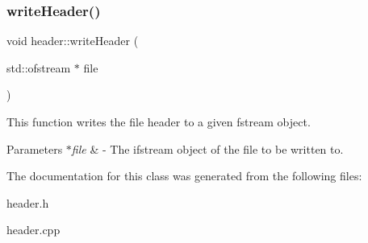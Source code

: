 \subsubsection{\texorpdfstring{write\+Header()}{writeHeader()}}
{\footnotesize\ttfamily void header\+::write\+Header (\begin{DoxyParamCaption}\item[{std\+::ofstream $\ast$}]{file }\end{DoxyParamCaption})}

This function writes the file header to a given fstream object. 
\begin{DoxyParams}{Parameters}
{\em $\ast$file} & -\/ The ifstream object of the file to be written to. \\
\hline
\end{DoxyParams}


The documentation for this class was generated from the following files\+:\begin{DoxyCompactItemize}
\item 
header.\+h\item 
header.\+cpp\end{DoxyCompactItemize}
